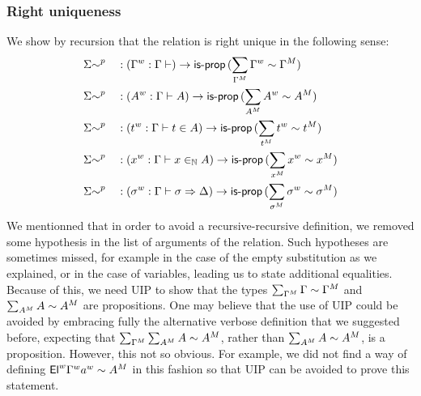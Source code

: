   \subsubsection{Right uniqueness}
  We show by recursion that the relation is right unique in the following sense:
  \begin{alignat*}{5}
    &
    {\Sigma{\sim}}^p
    && : ({\Gamma}^w : \Gamma \vdash ) \rightarrow
    \mathsf{is\text{-}prop}\, (\sum_{{\Gamma}^M} {\Gamma}^w \sim {\Gamma}^M)
    \\
    &
    {\Sigma{\sim}}^p
    && : ({A}^w : \Gamma \vdash A) \rightarrow
    \mathsf{is\text{-}prop}\, (\sum_{{A}^M} {A}^w \sim {A}^M)
    \\
    &
    {\Sigma{\sim}}^p
    && : ({t}^w : \Gamma \vdash t \in A) \rightarrow
    \mathsf{is\text{-}prop}\, (\sum_{{t}^M} {t}^w \sim {t}^M)
    \\
    &
    {\Sigma{\sim}}^p
    && : ({x}^w : \Gamma \vdash x \in_{\mathbb{N}} A) \rightarrow
    \mathsf{is\text{-}prop}\, (\sum_{{x}^M} {x}^w \sim {x}^M)
    \\
    &
    {\Sigma{\sim}}^p
    && : ({\sigma}^w : \Gamma \vdash \sigma \Rightarrow \Delta) \rightarrow
    \mathsf{is\text{-}prop}\, (\sum_{{\sigma}^M} {\sigma}^w \sim {\sigma}^M)
  \end{alignat*}
  We mentionned that in order to avoid a recursive-recursive definition,
  we removed some hypothesis in the list of arguments of the relation. Such
  hypotheses are sometimes missed, for example in the case of the empty
  substitution as we explained, or in the case of variables, leading us to state additional equalities.
  Because of this,
  we need UIP to show that the
  types $\sum_{{\Gamma}^M}\Gamma\sim{\Gamma}^M$ and
  $\sum_{{A}^M}A\sim{A}^M$ are propositions.
  One may believe that the use of UIP could be avoided by embracing fully the
  alternative verbose definition that we suggested before, expecting that
  $\sum_{{\Gamma}^M}\sum_{{A}^M}A\sim{A}^M$, rather than
  $\sum_{{A}^M}A\sim{A}^M$, is a proposition.
  However, this not so obvious. For example, we did not find
  a way of defining ${\mathsf{El}}^w{\Gamma}^w{a}^w\sim {A}^M$ in this fashion so that
  UIP can be avoided to prove this statement.

